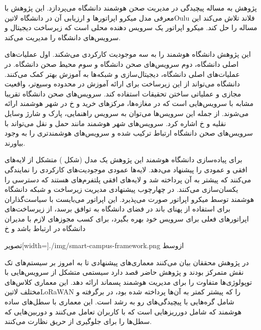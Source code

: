 

پژوهش  به مساله پیچیدگی در مدیریت صحن هوشمند دانشگاه می‌پردازد. این پژوهش با معرفی مدل میکرو اپراتورها و ارزیابی آن در دانشگاه ‌لاتین{Oulu} فلاند تلاش می‌کند این مساله را حل کند.
میکرو اپراتور یک سرویس دهنده محلی است که زیرساخت دیجیتال و سرویس‌های دانشگاه را مدیریت می‌کند.

این پژوهش دانشگاه هوشمند را به سه موجودیت کارکردی می‌شکند. اول عملیات‌های اصلی دانشگاه، دوم سرویس‌های صحن دانشگاه و سوم محیط صحن دانشگاه.
در عملیات‌های اصلی دانشگاه، دیجیتال‌سازی و شبکه‌ها به آموزش بهتر کمک می‌کنند. دانشگاه می‌تواند از این زیرساخت برای ارائه آموزش در محدوده وسیع‌تر، واقعیت مجازی و عملیاتی ساختن تحقیقات استفاده کند.
سرویس‌های صحن دانشگاه تقریبا مشابه با سرویس‌هایی است که در مغازه‌ها، مرکزهای خرید و ‌خ در شهر هوشمند ارائه می‌شوند. از جمله این سرویس‌ها می‌توان به سرویس راهنمایی، پارک و شارژ وسایل نقلیه و ‌خ اشاره کرد.
سرویس‌های شهر هوشمند مانند حمل و نقل می‌تواند با سرویس‌های صحن دانشگاه ارتباط ترکیب شده و سرویس‌های هوشمند‌تری را به وجود بیاورند.

برای پیاده‌سازی دانشگاه هوشمند این پژوهش یک مدل (شکل ) متشکل از لایه‌های افقی و عمودی را پیشنهاد می‌دهد. لایه‌ها عمودی موجودیت‌های کارکردی را نمایندگی می‌کنند که پیشتر به آن پرداخته شد و لایه‌های
افقی پلتفرم‌های هستند که دسترسی را یکسان‌سازی می‌کنند. در چهارچوب پیشنهادی مدیریت زیرساخت و شبکه دانشگاه هوشمند توسط میکرو اپراتور صورت می‌پذیرد. این اپراتور می‌بایست با سیاست‌گذاران برای استفاده از پهنای باند در فضای دانشگاه
به توافق برسد، از زیرساخت‌های اپراتورهای فعلی برای سرویس خود بهره بگیرد، برای کسب مجوزهای لازم با مدیران دانشگاه در ارتباط باشد و ‌خ

‌تصویر[width=\textwidth]{./img/smart-campus-framework.png}
‌ازوسط



در پژوهش  محققان بیان می‌کنند معماری‌های پیشنهادی تا به امروز بر سیستم‌های تک نقش متمرکز بودند و پژوهش حاضر قصد دارد سیستمی متشکل از سرویس‌هایی با توپولوژی‌ها متفاوت را
برای مدیریت هوشمند پسماند ارائه دهد. این معماری کلاس‌های مختلف ‌لاتین{LoRaWAN} را که پیشتر کمتر به آن‌ها پرداخته شده بود، در برگرفته و شامل گره‌هایی با پیچیدگی‌های رو به رشد است.
این معماری با سطل‌های ساده هوشمند که شامل دورریزهایی است که با کاربران تعامل می‌کنند و دوربین‌هایی که سطل‌ها را برای جلوگیری از حریق نظارت می‌کنند.

